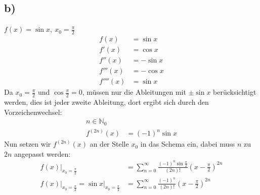 \documentclass{theozettel}
\begin{document}
\subsection*{b)}$f\left(x\right)=\sin x, \ x_0=\frac{\pi}{2}$
\begin{align*}
f\left(x\right)&=\sin x\\
f'\left(x\right)&=\cos x\\
f''\left(x\right)&=-\sin x\\
f'''\left(x\right) &= -\cos x\\
f''''\left(x\right) &= \sin x
\end{align*}
Da $x_0=\frac{\pi}{2}$ und $\cos\frac{\pi}{2}=0$, müssen nur die Ableitungen mit $\pm\sin x$ berücksichtigt werden, dies ist jeder zweite Ableitung, dort ergibt sich durch den Vorzeichenwechsel:
\begin{align*}
n\in\mathbb{N}_0\\
f^{\left(2n\right)}\left(x\right)&=\left(-1\right)^n\sin x
\end{align*}
Nun setzen wir $f^{\left(2n\right)}\left(x\right)$ an der Stelle $x_0$ in das Schema ein, dabei muss $n$ zu $2n$ angepasst werden:
\begin{align*}
f\left(x\right)\big|_{x_0=\frac{\pi}{2}}&=\sum_{n=0}^\infty \frac{\left(-1\right)^n\sin \frac{\pi}{2}}{\left(2n\right)!}\left(x-\frac{\pi}{2}\right)^{2n}\\
f\left(x\right)\big|_{x_0=\frac{\pi}{2}}=\sin x\big|_{x_0=\frac{\pi}{2}}&=\sum_{n=0}^\infty \frac{\left(-1\right)^n}{\left(2n\right)!}\left(x-\frac{\pi}{2}\right)^{2n}
\end{align*}
\end{document}
